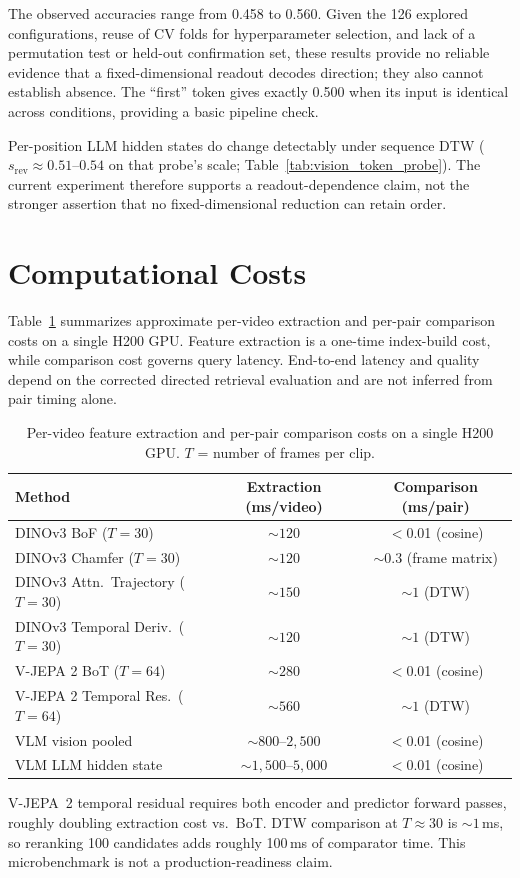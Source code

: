 \documentclass{article}
\theoremstyle{remark}
\begin{document}
The observed accuracies range from 0.458 to 0.560. Given the 126 explored configurations, reuse of CV folds for hyperparameter selection, and lack of a permutation test or held-out confirmation set, these results provide no reliable evidence that a fixed-dimensional readout decodes direction; they also cannot establish absence. The ``first'' token gives exactly 0.500 when its input is identical across conditions, providing a basic pipeline check.

Per-position LLM hidden states do change detectably under sequence DTW ($s_\text{rev} \approx 0.51$--$0.54$ on that probe's scale; Table~\ref{tab:vision_token_probe}). The current experiment therefore supports a readout-dependence claim, not the stronger assertion that no fixed-dimensional reduction can retain order.

\section{Computational Costs}
\label{sec:computational_costs}

Table~\ref{tab:costs} summarizes approximate per-video extraction and per-pair comparison costs on a single H200 GPU. Feature extraction is a one-time index-build cost, while comparison cost governs query latency. End-to-end latency and quality depend on the corrected directed retrieval evaluation and are not inferred from pair timing alone.

\begin{table}[h]
\centering
\caption{Per-video feature extraction and per-pair comparison costs on a single H200 GPU. $T$ = number of frames per clip.}
\label{tab:costs}
\begin{tabular}{lcc}
\toprule
\textbf{Method} & \textbf{Extraction (ms/video)} & \textbf{Comparison (ms/pair)} \\
\midrule
DINOv3 BoF ($T\!=\!30$) & ${\sim}120$ & $<$0.01 (cosine) \\
DINOv3 Chamfer ($T\!=\!30$) & ${\sim}120$ & ${\sim}0.3$ (frame matrix) \\
DINOv3 Attn.\ Trajectory ($T\!=\!30$) & ${\sim}150$ & ${\sim}1$ (DTW) \\
DINOv3 Temporal Deriv.\ ($T\!=\!30$) & ${\sim}120$ & ${\sim}1$ (DTW) \\
V-JEPA 2 BoT ($T\!=\!64$) & ${\sim}280$ & $<$0.01 (cosine) \\
V-JEPA 2 Temporal Res.\ ($T\!=\!64$) & ${\sim}560$ & ${\sim}1$ (DTW) \\
VLM vision pooled & ${\sim}800$--$2{,}500$ & $<$0.01 (cosine) \\
VLM LLM hidden state & ${\sim}1{,}500$--$5{,}000$ & $<$0.01 (cosine) \\
\bottomrule
\end{tabular}
\begin{flushleft}
\small V-JEPA~2 temporal residual requires both encoder and predictor forward passes, roughly doubling extraction cost vs.\ BoT. DTW comparison at $T \approx 30$ is ${\sim}1$\,ms, so reranking 100 candidates adds roughly 100\,ms of comparator time. This microbenchmark is not a production-readiness claim.
\end{flushleft}
\end{table}
\end{document}
